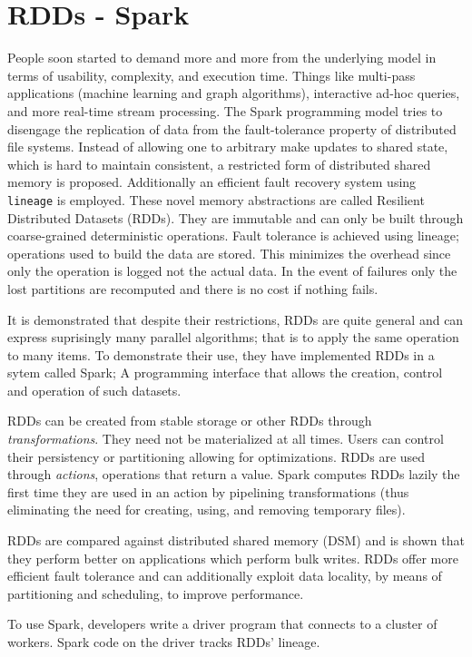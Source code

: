 \documentclass[letterpaper,twocolumn,10pt]{article}
\begin{document}
\section{RDDs - Spark}
People soon started to demand more and more from the underlying model in terms of usability, complexity, and execution time. 
Things like multi-pass applications (machine learning and graph algorithms), interactive ad-hoc queries, and more real-time stream processing. 
The Spark programming model tries to disengage the replication of data from the fault-tolerance property of distributed file systems. 
Instead of allowing one to arbitrary make updates to shared state, which is hard to maintain consistent, a restricted form of distributed shared memory is proposed. 
Additionally an efficient fault recovery system using {\tt lineage} is employed. 
These novel memory abstractions are called Resilient Distributed Datasets (RDDs). 
They are immutable and can only be built through coarse-grained deterministic operations. 
Fault tolerance is achieved using lineage; operations used to build the data are stored. 
This minimizes the overhead since only the operation is logged not the actual data. 
In the event of failures only the lost partitions are recomputed and there is no cost if nothing fails.

It is demonstrated that despite their restrictions, RDDs are quite general and can express suprisingly many parallel algorithms; that is to apply the same operation to many items. 
To demonstrate their use, they have implemented RDDs in a sytem called Spark; 
A programming interface that allows the creation, control and operation of such datasets.

RDDs can be created from stable storage or other RDDs through \textit{transformations}. 
They need not be materialized at all times. Users can control their persistency or partitioning allowing for optimizations. 
RDDs are used through \textit{actions}, operations that return a value. 
Spark computes RDDs lazily the first time they are used in an action by pipelining transformations (thus eliminating the need for creating, using, and removing temporary files).

RDDs are compared against distributed shared memory (DSM) and is shown that they perform better on applications which perform bulk writes.
RDDs offer more efficient fault tolerance and can additionally exploit data locality, by means of partitioning and scheduling, to improve performance.

To use Spark, developers write a driver program that connects to a cluster of workers. Spark code on the driver tracks RDDs' lineage.
\end{document}
